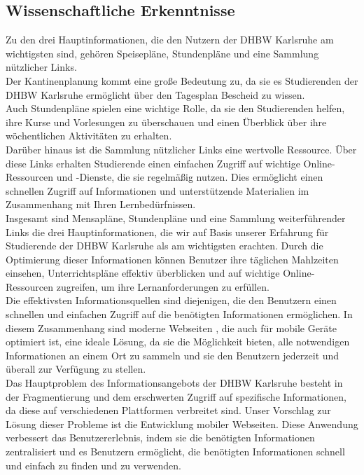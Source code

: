 \subsection{Wissenschaftliche Erkenntnisse} 
Zu den drei Hauptinformationen, die den Nutzern der DHBW Karlsruhe am wichtigsten sind, gehören Speisepläne, Stundenpläne und eine Sammlung nützlicher Links.\\
Der Kantinenplanung kommt eine große Bedeutung zu, da sie es Studierenden der DHBW Karlsruhe ermöglicht über den Tagesplan Bescheid zu wissen.\\
Auch Stundenpläne spielen eine wichtige Rolle, da sie den Studierenden helfen, ihre Kurse und Vorlesungen zu überschauen  und einen Überblick über ihre wöchentlichen Aktivitäten zu erhalten.\\ 
Darüber hinaus ist die Sammlung nützlicher Links eine wertvolle Ressource. Über diese Links erhalten Studierende einen einfachen Zugriff auf wichtige Online-Ressourcen und -Dienste, die sie regelmäßig nutzen. Dies ermöglicht einen schnellen Zugriff auf Informationen und unterstützende Materialien im Zusammenhang mit Ihren Lernbedürfnissen.\\ 
Insgesamt sind Mensapläne, Stundenpläne und eine Sammlung weiterführender Links die drei Hauptinformationen, die wir auf Basis unserer Erfahrung  für Studierende der DHBW Karlsruhe als am wichtigsten erachten. Durch die Optimierung dieser Informationen können Benutzer ihre täglichen Mahlzeiten einsehen, Unterrichtspläne effektiv überblicken und auf wichtige Online-Ressourcen zugreifen, um ihre Lernanforderungen zu erfüllen.\\
Die effektivsten Informationsquellen sind diejenigen, die den Benutzern einen schnellen und einfachen Zugriff auf die benötigten Informationen ermöglichen. In diesem Zusammenhang sind moderne  Webseiten , die auch für mobile Geräte optimiert ist, eine ideale Lösung, da sie die Möglichkeit bieten, alle notwendigen Informationen an einem Ort zu sammeln und sie den Benutzern jederzeit und überall zur Verfügung zu stellen.\\
Das Hauptproblem des Informationsangebots der DHBW Karlsruhe besteht in der Fragmentierung  und dem erschwerten Zugriff auf spezifische Informationen, da diese auf verschiedenen Plattformen verbreitet sind. Unser Vorschlag zur Lösung dieser Probleme ist die Entwicklung mobiler Webseiten. Diese Anwendung verbessert das Benutzererlebnis, indem sie die benötigten Informationen zentralisiert und es Benutzern ermöglicht, die benötigten Informationen schnell und einfach zu finden und zu verwenden.\\ 

